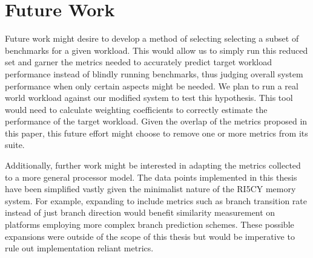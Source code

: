 \documentclass[../bachelor_paper.tex]{subfiles}
\begin{document}
\chapter{Future Work}
    \label{ch:future}
Future work might desire to develop a method of selecting selecting a subset of benchmarks for a given workload. This would allow us to simply run this reduced set and garner the metrics needed to accurately predict target workload performance instead of blindly running benchmarks, thus judging overall system performance when only certain aspects might be needed. We plan to run a real world workload against our modified system to test this hypothesis. This tool would need to calculate weighting coefficients to correctly estimate the performance of the target workload. Given the overlap of the metrics proposed in this paper, this future effort might choose to remove one or more metrics from its suite.

Additionally, further work might be interested in adapting the metrics collected to a more general processor model. The data points implemented in this thesis have been simplified vastly given the minimalist nature of the RI5CY memory system. For example, expanding to include metrics such as branch transition rate \cite{haungsBranchTransitionRate2000} instead of just branch direction would benefit similarity measurement on platforms employing more complex branch prediction schemes. These possible expansions were outside of the scope of this thesis but would be imperative to rule out implementation reliant metrics.


\isstandalone



\fi
\end{document}
